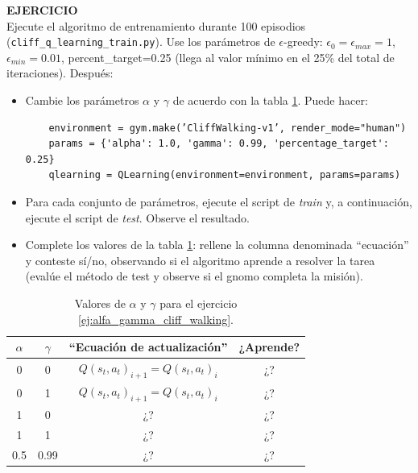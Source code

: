 \documentclass{article}
\begin{document}
\begin{exercise}
\label{ej:alfa_gamma_cliff_walking}
\textbf{EJERCICIO}\\
Ejecute el algoritmo de entrenamiento durante 100 episodios (\texttt{cliff\_q\_learning\_train.py}). Use los parámetros de $\epsilon$-greedy: $\epsilon_0=\epsilon_{max}=1$, $\epsilon_{min}=0.01$, percent\_target=0.25 (llega al valor mínimo en el 25\% del total de iteraciones). Después:
\begin{itemize}
    \item[a)] Cambie los parámetros $\alpha$ y $\gamma$ de acuerdo con la tabla     \ref{tab:alfa_gamma_cliff_walking}. Puede hacer:
    \begin{verbatim}
    environment = gym.make(’CliffWalking-v1’, render_mode="human")
    params = {'alpha': 1.0, 'gamma': 0.99, 'percentage_target': 0.25}
    qlearning = QLearning(environment=environment, params=params)
    \end{verbatim}
    \item[b)] Para cada conjunto de parámetros, ejecute el script de \textit{train} y, a continuación, ejecute el script de \textit{test}. Observe el resultado.
    \item[c)] Complete los valores de la tabla \ref{tab:alfa_gamma_cliff_walking}: rellene la columna denominada ``ecuación'' y conteste sí/no, observando si el algoritmo aprende a resolver la tarea (evalúe el método de test y observe si el gnomo completa la misión).
\end{itemize}
\end{exercise}

\begin{table}[t]
\centering
\begin{tabular}{|c|c|c|c|}
\hline
 $\alpha$ & $\gamma$  & ``Ecuación de actualización''  & ¿Aprende?   \\\hline
 0 & 0 & 
$Q(s_t,a_t)_{i+1} = Q(s_t,a_t)_{i}$ & ¿?\\\hline
 0 & 1 & $Q(s_t,a_t)_{i+1} = Q(s_t,a_t)_{i}$ & ¿?\\\hline
1   & 0  &¿?  &¿?\\\hline
1& 1 & ¿? & ¿?\\\hline
0.5 & 0.99 & ¿? & ¿?\\\hline
\end{tabular}
\caption{Valores de $\alpha$ y $\gamma$ para el ejercicio \ref{ej:alfa_gamma_cliff_walking}.}
\label{tab:alfa_gamma_cliff_walking}
\end{table}

\end{document}

